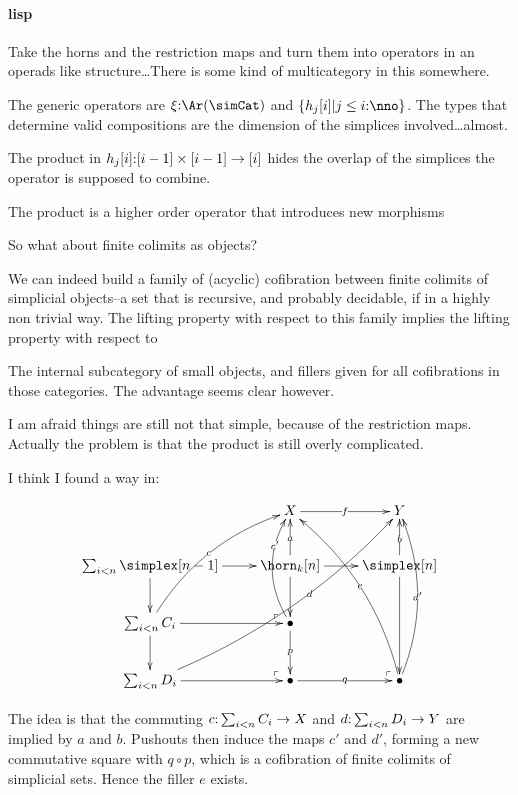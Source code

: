 \documentclass[csh.tex]{subfiles}
\makeatletter
\newcommand\pushout{\ar@{}[dr]|(.9)\ulcorner}
\makeatother
\begin{document}
\paragraph{lisp}
Take the horns and the restriction maps and turn them into operators in an operads like structure\dots There is some kind of multicategory in this somewhere. 

The generic operators are $\xi\of\Ar(\simCat)$ and $\set{ h_j[i] | j\leq i\of\nno }$. The types that determine valid compositions are the dimension of the simplices involved\dots almost.

The product in $h_j[i]\mathord : [i-1]\times[i-1]\to [i]$ hides the overlap of the simplices the operator is supposed to combine.

The product is a higher order operator that introduces new morphisms 

So what about finite colimits as objects?

We can indeed build a family of (acyclic) cofibration between finite colimits of simplicial objects--a set that is recursive, and probably decidable, if in a highly non trivial way. The lifting property with respect to this family implies the lifting property with respect to 

The internal subcategory of small objects, and fillers given for all cofibrations in those categories. The advantage seems clear however.

I am afraid things are still not that simple, because of the restriction maps. Actually the problem is that the product is still overly complicated.

I think I found a way in:

\[ \xymatrix{
& X\ar[r]|f & Y\\
%
\sum_{i<n} \simplex[n-1] \ar[r]\ar[d]\pushout & 
\horn_k[n] \ar[u]|a\ar[d]\ar[r] & 
\simplex[n] \ar[dd]\ar[u]|b \\
%
\sum_{i<n} C_i \ar@/^{3ex}/[uur]|c \ar[r]\ar[d]\pushout & 
\bullet \ar@/^{3ex}/[uu]|(.7){c'} \ar[d]|p\pushout \\
%
\sum_{i<n} D_i \ar@/_{3ex}/[uuurr]|(.6)d \ar[r] & 
\bullet \ar[r]|q & \bullet \ar@/_{3ex}/[uuu]|{d'} \ar@/_{3ex}/[uuul]|{e} 
}\]

The idea is that the commuting $c\mathord : \sum_{i<n} C_i\to X$ and $d\mathord : \sum_{i<n} D_i\to Y$ are implied by $a$ and $b$. Pushouts then induce the maps $c'$ and $d'$, forming a new commutative square with $q\circ p$, which is a cofibration of finite colimits of simplicial sets. Hence the filler $e$ exists.
\end{document}
